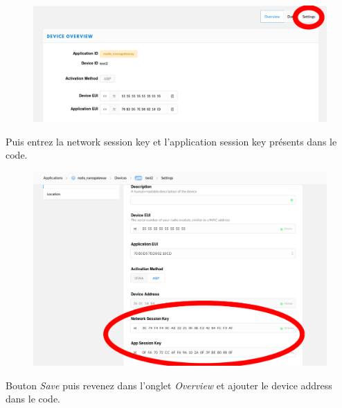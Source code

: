 \documentclass{article}
\begin{document}
  \begin{figure}[H]
\begin{center}
\advance\leftskip-3cm
\advance\rightskip-3cm
\includegraphics[keepaspectratio=true,scale=0.4]{settings_button_apb.png}

\label{visina8}
\end{center}\end{figure}
 
Puis entrez la network session key et l'application session key présents dans le code. 

\begin{figure}[H]
\begin{center}
\advance\leftskip-3cm
\advance\rightskip-3cm
\includegraphics[keepaspectratio=true,scale=0.4]{settings_apb.png}
\label{visina8}
\end{center}\end{figure}

Bouton \textit{Save} puis revenez dans l'onglet \textit{Overview} et ajouter le device address dans le code.
\end{document}
